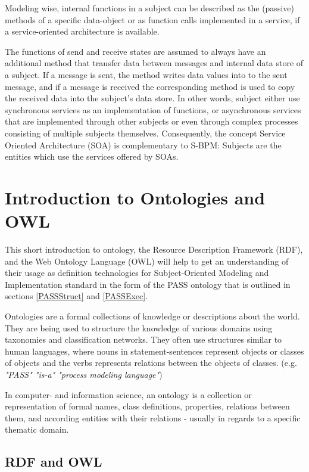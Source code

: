 Modeling wise, internal functions in a subject can be described as the (passive) methods of a specific data-object or as function calls implemented in a service, if a service-oriented architecture is available.

The functions of send and receive states are assumed to always have an additional method that transfer data between messages and internal data store of a subject. If a message is sent, the method writes data values into to the sent message, and if a message is received the corresponding method is used to copy the received data into the subject's data store. In other words, subject either use synchronous services as an implementation of functions, or asynchronous services that are implemented through other subjects or even through complex processes consisting of multiple subjects themselves. Consequently, the concept Service Oriented Architecture (SOA) is complementary to S-BPM: Subjects are the entities which use the services offered by SOAs.

\section{Introduction to Ontologies and OWL }
\label{IntroOntology}

This short introduction to ontology, the Resource Description Framework (RDF), and the Web Ontology Language (OWL) will help to get an understanding of their usage as definition technologies for Subject-Oriented Modeling and Implementation standard in the form of the PASS ontology that is outlined in sections \ref{PASSStruct} and \ref{PASSExec}.

Ontologies are a formal collections of knowledge or descriptions about the world. They are being used to structure the knowledge of  various domains using taxonomies and classification networks. They often use structures similar to human languages, where nouns in statement-sentences represent objects or classes of objects and the verbs represents relations between the objects of classes. (e.g. \textit{"PASS" "is-a" "process modeling language"})

In computer- and information science, an ontology is a collection or representation of formal names, class definitions, properties, relations between them, and according entities with their relations  - usually in regards to a specific thematic domain.


\subsection{RDF and OWL}

